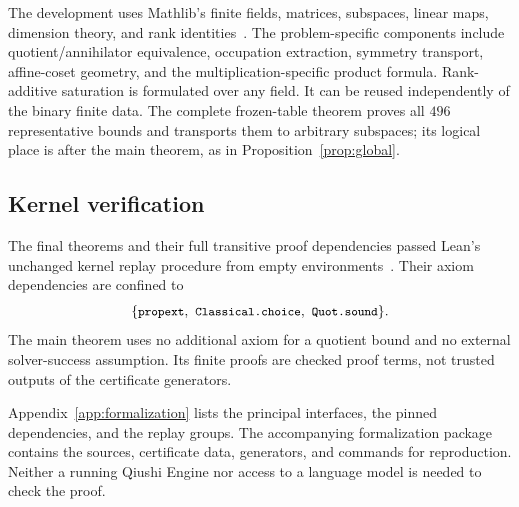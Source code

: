 The development uses Mathlib's finite fields, matrices, subspaces,
linear maps, dimension theory, and rank
identities~\cite{mathlib}. The problem-specific components include
quotient/annihilator equivalence, occupation extraction, symmetry
transport, affine-coset geometry, and the multiplication-specific
product formula. Rank-additive saturation is formulated over any
field. It can be reused independently of the binary finite data.
The complete frozen-table theorem proves all $496$ representative
bounds and transports them to arbitrary subspaces; its logical place
is after the main theorem, as in
Proposition~\ref{prop:global}.

\subsection{Kernel verification}
The final theorems and their full transitive proof dependencies passed
Lean's unchanged kernel replay procedure from empty
environments~\cite{lean-replay}. Their axiom dependencies are confined to
\[
 \{\code{propext},\ \code{Classical.choice},\ \code{Quot.sound}\}.
\]
The main theorem uses no additional axiom for a quotient bound and no
external solver-success assumption. Its finite proofs are checked
proof terms, not trusted outputs of the certificate generators.

Appendix~\ref{app:formalization} lists the principal interfaces, the
pinned dependencies, and the replay groups.
The accompanying formalization package~\cite{qiushi-lean} contains the
sources, certificate data, generators, and commands for reproduction.
Neither a running Qiushi Engine nor access to a language model is
needed to check the proof.
